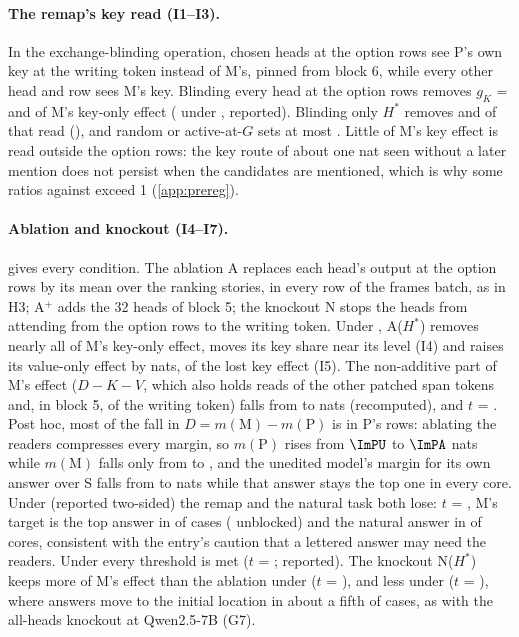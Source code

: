 \paragraph{The remap's key read (I1--I3).} In the exchange-blinding operation, chosen heads at the option rows see P's own key at the writing token instead of M's, pinned from block 6, while every other head and row sees M's key. Blinding every head at the option rows removes $g_K$ = \IoneGOpt{} and \IoneGLetter{} of M's key-only effect (\IoneGPost{} under \fmtPost{}, reported). Blinding only $H^*$ removes \ItwoKOOpt{} and \ItwoKOLetter{} of that read (\ItwoKOPost{}), and random or active-at-$G$ sets at most \IthreeMax{}. Little of M's key effect is read outside the option rows: the key route of about one nat seen without a later mention does not persist when the candidates are mentioned, which is why some ratios against \fmtNone{} exceed 1 (\cref{app:prereg}).

\paragraph{Ablation and knockout (I4--I7).}  gives every condition. The ablation A replaces each head's output at the option rows by its mean over the ranking stories, in every row of the frames batch, as in H3; A$^+$ adds the 32 heads of block 5; the knockout N stops the heads from attending from the option rows to the writing token. Under \fmtOpt{}, A($H^*$) removes nearly all of M's key-only effect, moves its key share near its \fmtNone{} level (I4) and raises its value-only effect by \IfiveDV{} nats, \IfiveRatio{} of the lost key effect (I5). The non-additive part of M's effect ($D - K - V$, which also holds reads of the other patched span tokens and, in block 5, of the writing token) falls from \InonAddU{} to \InonAddA{} nats (recomputed), and $t$ = \IsixT{}. Post hoc, most of the fall in $D = m(\mathrm{M}) - m(\mathrm{P})$ is in P's rows: ablating the readers compresses every margin, so $m(\mathrm{P})$ rises from $\ImPU$ to $\ImPA$ nats while $m(\mathrm{M})$ falls only from \ImMU{} to \ImMA{}, and the unedited model's margin for its own answer over S falls from \IbMarginU{} to \IbMarginA{} nats while that answer stays the top one in every core. Under \fmtLetter{} (reported two-sided) the remap and the natural task both lose: $t$ = \IsixTLetter{}, M's target is the top answer in \IsixMTALetter{} of cases (\IsixMTLetter{} unblocked) and the natural answer in \IsixBBALetter{} of cores, consistent with the entry's caution that a lettered answer may need the readers. Under \fmtPost{} every threshold is met ($t$ = \IsixTPost{}; reported). The knockout N($H^*$) keeps more of M's effect than the ablation under \fmtOpt{} ($t$ = \InTOpt{}), and less under \fmtLetter{} ($t$ = \InTLetter{}), where answers move to the initial location in about a fifth of cases, as with the all-heads knockout at Qwen2.5-7B (G7).

